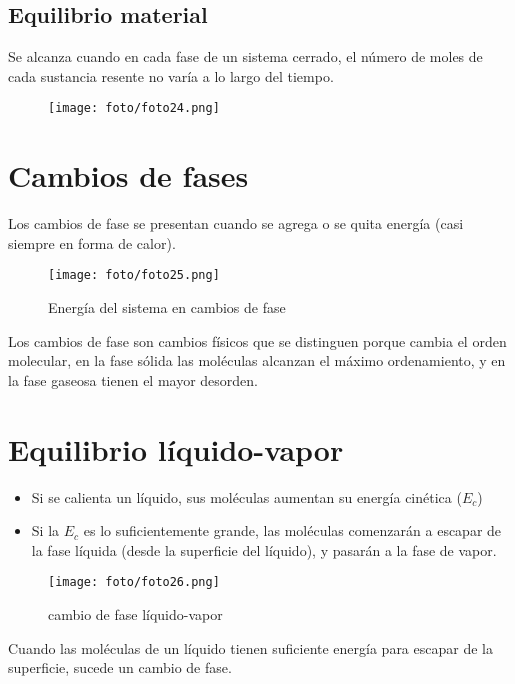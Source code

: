 \documentclass[]{article}
\begin{document}
\subsection{Equilibrio material}

Se alcanza cuando en cada fase de un sistema cerrado, el número de moles de cada sustancia resente no varía a lo largo del tiempo.

\begin{figure}[H]
\center
\texttt{[image: foto/foto24.png]}
\end{figure}



\section{Cambios de fases}
Los cambios de fase se presentan cuando se agrega o se quita energía (casi siempre en forma de calor).
\begin{figure}[H]
\center
\texttt{[image: foto/foto25.png]}
\caption{Energía del sistema en cambios de fase}
\end{figure}

Los cambios de fase son cambios físicos que se distinguen porque cambia el orden molecular, en la fase sólida las moléculas alcanzan el máximo ordenamiento, y en la fase gaseosa tienen el mayor desorden.



\section{Equilibrio líquido-vapor}
\begin{itemize}
	\item Si se calienta un líquido, sus moléculas aumentan su energía cinética ($E_{c}$)
	\item Si la $E_{c}$ es lo suficientemente grande, las moléculas comenzarán a escapar de la fase líquida (desde la superficie del líquido), y pasarán a la fase de vapor.
\end{itemize}

\begin{figure}[H]
\center
\texttt{[image: foto/foto26.png]}
\caption{cambio de fase líquido-vapor}
\end{figure}

Cuando las moléculas de un líquido tienen suficiente energía para escapar de la superficie, sucede un cambio de fase.
\end{document}
